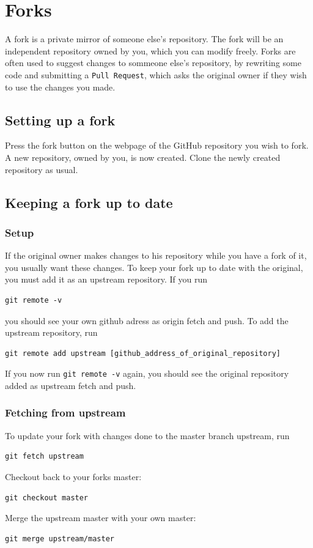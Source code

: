 \documentclass[12p,a4paper]{article}
\begin{document}
\newpage
\section{Forks}
\label{sec:forks}
A fork is a private mirror of someone else's repository. The fork will be an independent repository owned by you, which you can modify freely. Forks are often used to suggest changes to sommeone else's repository, by rewriting some code and submitting a \texttt{Pull Request}, which asks the original owner if they wish to use the changes you made.

\subsection{Setting up a fork}
Press the fork button on the webpage of the GitHub repository you wish to fork. A new repository, owned by you, is now created. Clone the newly created repository as usual.

\subsection{Keeping a fork up to date}
\subsubsection{Setup}
If the original owner makes changes to his repository while you have a fork of it, you usually want these changes. To keep your fork up to date with the original, you must add it as an upstream repository. If you run
\begin{verbatim}
git remote -v
\end{verbatim}
you should see your own github adress as origin fetch and push. To add the upstream repository, run
\begin{verbatim}
git remote add upstream [github_address_of_original_repository]
\end{verbatim}

If you now run \texttt{git remote -v} again, you should see the original repository added as upstream fetch and push.

\subsubsection{Fetching from upstream}
To update your fork with changes done to the master branch upstream, run
\begin{verbatim}
git fetch upstream
\end{verbatim}
Checkout back to your forks master:
\begin{verbatim}
git checkout master
\end{verbatim}
Merge the upstream master with your own master:
\begin{verbatim}
git merge upstream/master
\end{verbatim}
\end{document}
